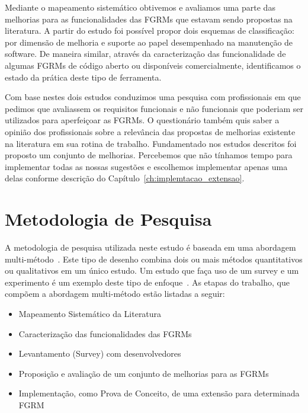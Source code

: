 Mediante o mapeamento sistemático obtivemos e avaliamos uma parte das melhorias
para as funcionalidades das FGRMs que estavam sendo propostas na literatura. A
partir do estudo foi possível propor dois esquemas de classificação: por
dimensão de melhoria e suporte ao papel desempenhado na manutenção de software.
De maneira similar, através da caracterização das funcionalidade de algumas
FGRMs de código aberto ou disponíveis comercialmente, identificamos o estado da
prática deste tipo de ferramenta.

Com base nestes dois estudos conduzimos uma pesquisa com profissionais em que
pedimos que avaliassem os requisitos funcionais e não funcionais que poderiam
ser utilizados para aperfeiçoar as FGRMs. O questionário também quis saber a
opinião dos profissionais sobre a relevância das propostas de me\-lho\-ri\-as
existente na literatura em sua rotina de trabalho. Fundamentado nos estudos
descritos foi proposto um conjunto de melhorias. Percebemos que não tínhamos
tempo para implementar todas as nossas sugestões e escolhemos implementar apenas
uma delas conforme descrição do Capítulo~\ref{ch:implemtacao_extensao}.

\section{Metodologia de Pesquisa}
\label{sec:intro-metodologia}


A metodologia de pesquisa utilizada neste estudo é baseada em uma abordagem
multi-método~\cite{hesse2010mixed}. Este tipo de desenho combina dois ou mais
métodos quantitativos ou qualitativos em um único estudo. Um estudo que faça uso
de um survey e um experimento é um exemplo deste tipo de
enfoque~\cite{hesse2010mixed}. As etapas do trabalho, que compõem a abordagem
multi-método estão listadas a seguir:

\begin{itemize}[(i)]
	\item Mapeamento Sistemático da Literatura~\cite{Petersen2008}
	\item Caracterização das funcionalidades das FGRMs
	\item Levantamento (Survey) com desenvolvedores~\cite{wohlin2012experimentation}
	\item Proposição e avaliação de um conjunto de melhorias para as FGRMs
    \item Implementação, como Prova de Conceito, de uma extensão para
        determinada FGRM
\end{itemize}

